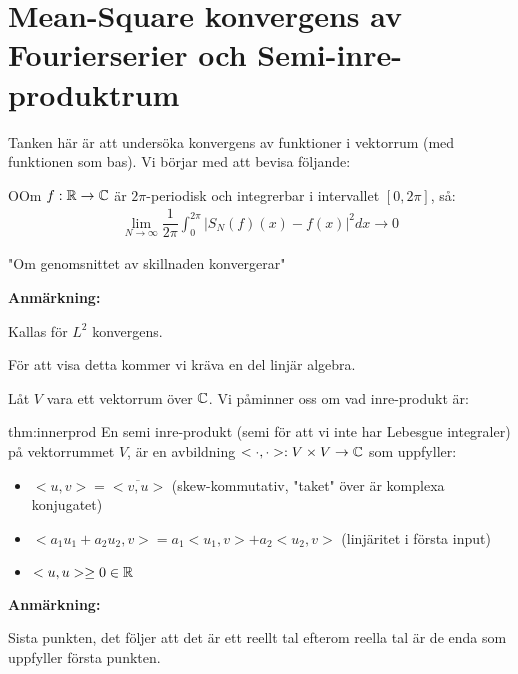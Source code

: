 \section{Mean-Square konvergens av Fourierserier och Semi-inre-produktrum}\par
\noindent Tanken här är att undersöka konvergens av funktioner i vektorrum (med funktionen som bas). Vi börjar med att bevisa följande:
\par\bigskip
\begin{theo}
  OOm $f:\mathbb{R}\to\mathbb{C}$ är $2\pi$-periodisk och integrerbar i intervallet $[0,2\pi]$, så:
  \begin{equation*}
    \begin{gathered}
      \lim_{N\to\infty}\dfrac{1}{2\pi}\int_{0}^{2\pi}\left|S_N(f)(x)-f(x)\right|^2dx \to0
    \end{gathered}
  \end{equation*}\par
  \noindent "Om genomsnittet av skillnaden konvergerar"
\end{theo}
\par\bigskip
\noindent\textbf{Anmärkning:}\par
\noindent Kallas för $L^2$ konvergens.
\par\bigskip
\noindent För att visa detta kommer vi kräva en del linjär algebra.
\par\bigskip
\noindent Låt $V$ vara ett vektorrum över $\mathbb{C}$. Vi påminner oss om vad inre-produkt är:
\par\bigskip
\begin{theo}{thm:innerprod}
  En semi inre-produkt (semi för att vi inte har Lebesgue integraler) på vektorrummet $V$, är en avbildning $<\cdot,\cdot>:V\times V\to\mathbb{C}$ som uppfyller:\par
  \begin{itemize}
    \item $<u,v> = \overline{<v,u>}$ (skew-kommutativ, "taket" över är komplexa konjugatet)
    \item $<a_1u_1+a_2u_2,v> = a_1<u_1,v>+a_2<u_2,v>$ (linjäritet i första input)
    \item $<u,u>\geq0\in\mathbb{R}$
  \end{itemize}
\end{theo}
\par\bigskip
\noindent\textbf{Anmärkning:}\par
\noindent Sista punkten, det följer att det är ett reellt tal efterom reella tal är de enda som uppfyller första punkten.
\par\bigskip
